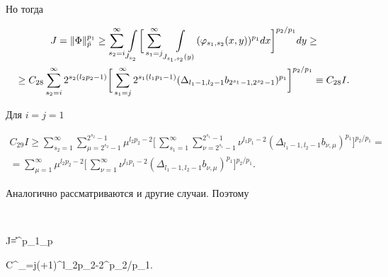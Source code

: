  


Но тогда 


\begin{multline*} 


J=\|\Phi\|_{\Bar p}^{p_1}\ge \sum^\infty_{s_2=i} 


\int\limits_{J_{s_2}}\biggl[\,\sum^\infty_{s_1=j} 


\int\limits_{J_{s_1,s_2}(y)}(\varphi_{s_1,s_2}(x,y))^{p_1}dx 


\biggr]^{p_2/p_1}dy \ge \\ 


% 


\ge C_{28}\sum^\infty_{s_2=i}2^{s_2(l_2p_2-1)}\biggl[\, 


\sum^\infty_{s_1=j}2^{s_1(l_1p_1-1)} 


(\Delta_{l_1-1,l_2-1}b_{2^{s_1}-1,2^{s_2}-1})^{p_1} 


\biggr]^{p_2/p_1} \equiv C_{28}I. 


\end{multline*} 


% 


Для $i=j=1$ 


\begin{multline*} 


C_{29}I\ge\sum^\infty_{s_2=1}\sum^{2^{s_2}-1}_{\mu=2^{s_2}-1} 


\mu^{l_2p_2-2}\biggl[\,\sum^\infty_{s_1=1} 


\sum^{2^{s_1}-1}_{\nu=2^{s_1}-1}\nu^{l_1p_1-2} 


(\Delta_{l_1-1,l_2-1}b_{\nu,\mu})^{p_1}\biggr]^{p_2/p_1} = \\ 


% 


=\sum^\infty_{\mu=1}\mu^{l_2p_2-2}\biggl[\, 


\sum^\infty_{\nu=1}\nu^{l_1 p_1-2} 


(\Delta_{l_1-1,l_2-1}b_{\nu,\mu})^{p_1}\biggr]^{p_2/p_1}. 


\end{multline*} 


Аналогично рассматриваются и другие случаи. Поэтому 


$$ 


J=\|\Phi\|^{p_1}_{\Bar p} \ge  


C\sum^\infty_{\mu=j}(\mu+1)^{l_2p_2-2}\biggl[\,


\sum^\infty_{\nu=i}(\nu+1)^{l_1 p_1-2} 


(\Delta_{l_1-1,l_2-1}b_{\nu,\mu})^{p_1}\biggr]^{p_2/p_1}. 


